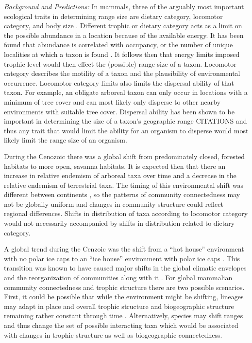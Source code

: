 \documentclass[12pt,letterpaper]{article}
\begin{document}
\textit{Background and Predictions:}
In mammals, three of the arguably most important ecological traits in determining range size are dietary category, locomotor category, and body size \citep{Jernvall2004,Smith2008b,Smith2004,Lyons2005,Lyons2010}. Different trophic or dietary category acts as a limit on the possible abundance in a location because of the available energy. It has been found that abundance is correlated with occupancy, or the number of unique localities at which a taxon is found \citep{Jernvall2002,Fortelius2002,Brown1984}. It follows then that energy limits imposed trophic level would then effect the (possible) range size of a taxon. Locomotor category describes the motility of a taxon and the plausibility of environmental occurrence. Locomotor category limits also limits the dispersal ability of that taxon. For example, an obligate arboreal taxon can only occur in locations with a minimum of tree cover and can most likely only disperse to other nearby environments with suitable tree cover. Dispersal ability has been shown to be important in determining the size of a taxon's geographic range CITATIONS and thus any trait that would limit the ability for an organism to disperse would most likely limit the range size of an organism.

During the Cenozoic there was a global shift from predominately closed, forested habitats to more open, savanna habitats. It is expected then that there an increase in relative endemism of arboreal taxa over time and a decrease in the relative endemism of terrestrial taxa. The timing of this environmental shift was different between continents \citep{Stromberg2005,Stromberg2013}, so the patterns of community connectedness may not be globally uniform and changes in community structure could reflect regional differences. Shifts in distribution of taxa according to locomotor category would not necessarily accompanied by shifts in distribution related to dietary category.

A global trend during the Cenzoic was the shift from a ``hot house'' environment with no polar ice caps to an ``ice house'' environment with polar ice caps \citep{Zachos2008,Zachos2001}. This transition was known to have caused major shifts in the global climatic envelopes and the reorganization of communities along with it \citep{Janis1993a,Fortelius2002,Blois2009,Alroy2000g,Figueirido2012}. For global mammalian community connectedness and trophic structure there are two possible scenarios. First, it could be possible that while the environment might be shifting, lineages may adapt in place and overall trophic structure and biogeographic structure remaining rather constant through time \citep{Jernvall2004}. Alternatively, species may shift ranges and thus change the set of possible interacting taxa which would be associated with changes in trophic structure as well as biogeographic connectedness.
\end{document}
